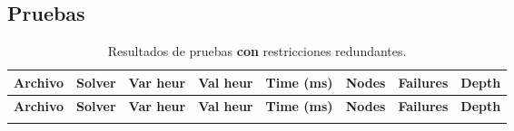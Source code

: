 
\subsection{Pruebas}\label{sec:01-jobshop_mantenimiento-pruebas}

\small

\begin{longtable}{l l l l r r r r}
\caption{Resultados de pruebas \textbf{con} restricciones redundantes.}\label{tab:pruebas-jobshop_mantenimiento-on}\\
\toprule
\textbf{Archivo} & \textbf{Solver} & \textbf{Var heur} & \textbf{Val heur} & \textbf{Time (ms)} & \textbf{Nodes} & \textbf{Failures} & \textbf{Depth} \\
\midrule
\endfirsthead
\toprule
\textbf{Archivo} & \textbf{Solver} & \textbf{Var heur} & \textbf{Val heur} & \textbf{Time (ms)} & \textbf{Nodes} & \textbf{Failures} & \textbf{Depth} \\
\midrule
\endhead
\bottomrule
\endlastfoot


\end{longtable}
